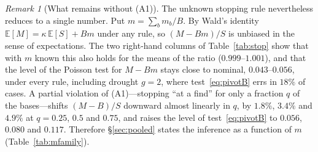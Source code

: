 \documentclass[11pt,a4paper]{article}
\theoremstyle{plain}
\theoremstyle{remark}
\newtheorem{remark}{Remark}
\begin{document}
\begin{remark}[What remains without (A1)]
The unknown stopping rule nevertheless reduces to a single number. Put
$m=\sum_bm_b/B$. By Wald's identity $\mathbb E[M]=\kappa\,\mathbb E[S]+Bm$ under
any rule, so $(M-Bm)/S$ is unbiased in the sense of expectations. The two
right-hand columns of Table~\ref{tab:stop} show that with $m$ known this also holds
for the means of the ratio ($0.999$--$1.001$), and that the level of the Poisson
test for $M-Bm$ stays close to nominal, $0.043$--$0.056$, under every rule, including drought
$g=2$, where test~\eqref{eq:pivotB} errs in $18\%$ of cases. A partial violation
of (A1)---stopping ``at a find'' for only a fraction $q$ of the bases---shifts
$(M-B)/S$ downward almost linearly in $q$, by $1.8\%$, $3.4\%$ and $4.9\%$ at
$q=0.25$, $0.5$ and $0.75$, and raises the level of test~\eqref{eq:pivotB} to
$0.056$, $0.080$ and $0.117$. Therefore \S\ref{sec:pooled} states the inference as
a function of $m$ (Table~\ref{tab:mfamily}).
\end{remark}
\end{document}
